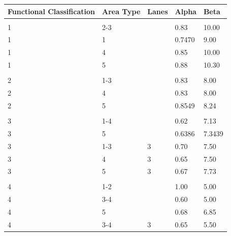 \documentclass[
]{article}
\begin{document}
\begin{longtabu} to 
\toprule
Functional Classification & Area Type & Lanes & Alpha & Beta\\
\midrule
\addlinespace[0.3em]
\\
\hspace{1em}1 & 2-3 &  & 0.83 & 10.00\\
\hspace{1em}1 & 1 &  & 0.7470 & 9.00\\
\hspace{1em}1 & 4 &  & 0.85 & 10.00\\
\hspace{1em}1 & 5 &  & 0.88 & 10.30\\
\addlinespace[0.3em]
\\
\hspace{1em}\hspace{1em}2 & 1-3 &  & 0.83 & 8.00\\
\hspace{1em}2 & 4 &  & 0.83 & 8.00\\
\hspace{1em}2 & 5 &  & 0.8549 & 8.24\\
\addlinespace[0.3em]
\\
\hspace{1em}\hspace{1em}3 & 1-4 &  & 0.62 & 7.13\\
\hspace{1em}3 & 5 &  & 0.6386 & 7.3439\\
\hspace{1em}3 & 1-3 & 3 & 0.70 & 7.50\\
\hspace{1em}3 & 4 & 3 & 0.65 & 7.50\\
\hspace{1em}3 & 5 & 3 & 0.67 & 7.73\\
\addlinespace[0.3em]
\\
\hspace{1em}4 & 1-2 &  & 1.00 & 5.00\\
\hspace{1em}4 & 3-4 &  & 0.60 & 5.00\\
\hspace{1em}4 & 5 &  & 0.68 & 6.85\\
\hspace{1em}4 & 3-4 & 3 & 0.65 & 5.50\\

\end{longtabu}
\end{document}
